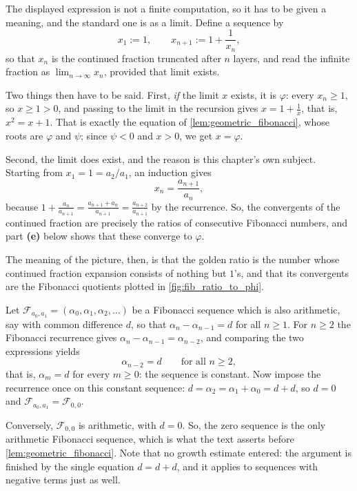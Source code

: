 \begin{exercisesolution*}
\label{sol:ch1_list_c}
The displayed expression is not a finite computation, so it has to be given a meaning, and the standard one is as a limit. Define a sequence by
\[
    x_1 := 1, \qquad x_{n+1} := 1 + \frac{1}{x_n},
\]
so that $x_n$ is the continued fraction truncated after $n$ layers, and read the infinite fraction as $\lim_{n \to \infty} x_n$, provided that limit exists.

Two things then have to be said. First, \emph{if} the limit $x$ exists, it is $\varphi$: every $x_n \ge 1$, so $x \ge 1 > 0$, and passing to the limit in the recursion gives $x = 1 + \frac{1}{x}$, that is, $x^2 = x + 1$. That is exactly the equation of \cref{lem:geometric_fibonacci}, whose roots are $\varphi$ and $\psi$; since $\psi < 0$ and $x > 0$, we get $x = \varphi$.

Second, the limit does exist, and the reason is this chapter's own subject. Starting from $x_1 = 1 = a_2/a_1$, an induction gives
\[
    x_n = \frac{a_{n+1}}{a_n},
\]
because $1 + \frac{a_n}{a_{n+1}} = \frac{a_{n+1} + a_n}{a_{n+1}} = \frac{a_{n+2}}{a_{n+1}}$ by the recurrence. So, the convergents of the continued fraction are precisely the ratios of consecutive Fibonacci numbers, and part \textbf{(e)} below shows that these converge to $\varphi$.

The meaning of the picture, then, is that the golden ratio is the number whose continued fraction expansion consists of nothing but $1$'s, and that its convergents are the Fibonacci quotients plotted in \cref{fig:fib_ratio_to_phi}.
\end{exercisesolution*}

\begin{exercisesolution}
\label{sol:ch1_list_d}
Let $\mathcal{F}_{a_0, a_1} = (\alpha_0, \alpha_1, \alpha_2, \dots)$ be a Fibonacci sequence which is also arithmetic, say with common difference $d$, so that $\alpha_n - \alpha_{n-1} = d$ for all $n \ge 1$. For $n \ge 2$ the Fibonacci recurrence gives $\alpha_n - \alpha_{n-1} = \alpha_{n-2}$, and comparing the two expressions yields
\[
    \alpha_{n-2} = d \qquad \text{for all } n \ge 2,
\]
that is, $\alpha_m = d$ for every $m \ge 0$: the sequence is constant. Now impose the recurrence once on this constant sequence: $d = \alpha_2 = \alpha_1 + \alpha_0 = d + d$, so $d = 0$ and $\mathcal{F}_{a_0,a_1} = \mathcal{F}_{0,0}$.

Conversely, $\mathcal{F}_{0,0}$ is arithmetic, with $d = 0$. So, the zero sequence is the only arithmetic Fibonacci sequence, which is what the text asserts before \cref{lem:geometric_fibonacci}. Note that no growth estimate entered: the argument is finished by the single equation $d = d + d$, and it applies to sequences with negative terms just as well.
\end{exercisesolution}

